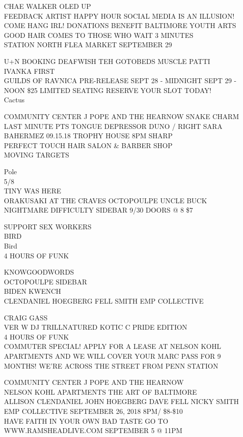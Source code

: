 \documentclass[10pt,letterpaper]{article}
\begin{document}
CHAE WALKER OLED UP\\
FEEDBACK ARTIST HAPPY HOUR SOCIAL MEDIA IS AN ILLUSION!  COME HANG IRL!  DONATIONS BENEFIT BALTIMORE YOUTH ARTS\\
GOOD HAIR COMES TO THOSE WHO WAIT 3 MINUTES\\
STATION NORTH FLEA MARKET SEPTEMBER 29

U+N BOOKING DEAFWISH TEH GOTOBEDS MUSCLE PATTI\\
IVANKA FIRST\\
GUILDS OF RAVNICA PRE{-}RELEASE SEPT 28 {-} MIDNIGHT SEPT 29 {-} NOON \$25 LIMITED SEATING RESERVE YOUR SLOT TODAY!\\
Cactus

COMMUNITY CENTER J POPE AND THE HEARNOW SNAKE CHARM\\
LAST MINUTE PTS TONGUE DEPRESSOR DUNO / RIGHT SARA BAHERMEZ 09.15.18 TROPHY HOUSE 8PM SHARP\\
PERFECT TOUCH HAIR SALON \& BARBER SHOP\\
MOVING TARGETS

Pole\\
5/8\\
TINY WAS HERE\\
ORAKUSAKI AT THE CRAVES OCTOPOULPE UNCLE BUCK NIGHTMARE DIFFICULTY SIDEBAR 9/30 DOORS @ 8 \$7

SUPPORT SEX WORKERS\\
BIRD\\
Bird\\
4 HOURS OF FUNK

KNOWGOODWORDS\\
OCTOPOULPE SIDEBAR\\
BIDEN KWENCH\\
CLENDANIEL HOEGBERG FELL SMITH EMP COLLECTIVE

CRAIG GASS\\
VER W DJ TRILLNATURED KOTIC C PRIDE EDITION\\
4 HOURS OF FUNK\\
COMMUTER SPECIAL!  APPLY FOR A LEASE AT NELSON KOHL APARTMENTS AND WE WILL COVER YOUR MARC PASS FOR 9 MONTHS!  WE'RE ACROSS THE STREET FROM PENN STATION

COMMUNITY CENTER J POPE AND THE HEARNOW\\
NELSON KOHL APARTMENTS THE ART OF BALTIMORE\\
ALLISON CLENDANIEL JOHN HOEGBERG DAVE FELL NICKY SMITH EMP COLLECTIVE SEPTEMBER 26, 2018 8PM/ \$8{-}\$10\\
HAVE FAITH IN YOUR OWN BAD TASTE GO TO WWW.RAMSHEADLIVE.COM SEPTEMBER 5 @ 11PM
\end{document}

